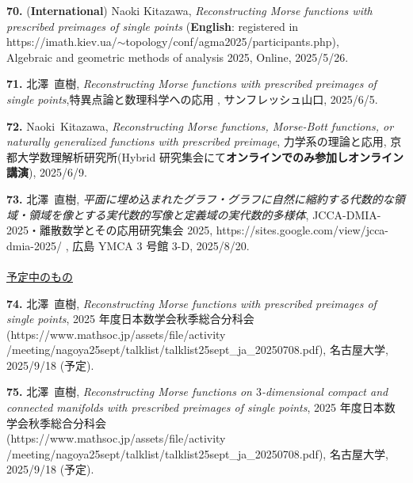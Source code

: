 \documentclass{article}
\begin{document}
\par\noindent
{\bf 70.} ({\bf International}) Naoki Kitazawa, \textsl{Reconstructing Morse functions with prescribed preimages of single points} ({\bf English}: registered in\\ https://imath.kiev.ua/$\sim$topology/conf/agma2025/participants.php),\\ Algebraic and geometric methods of analysis 2025, Online, 2025/5/26.

\par\noindent
{\bf 71.} 北澤\ 直樹, \textsl{Reconstructing Morse functions with prescribed preimages of single points},特異点論と数理科学への応用 , サンフレッシュ山口, 2025/6/5.

\par\noindent
{\bf 72.} Naoki\ Kitazawa, \textsl{Reconstructing Morse functions, Morse-Bott functions, or naturally generalized functions with prescribed preimage}, 力学系の理論と応用, 京都大学数理解析研究所(Hybrid 研究集会にて{\bf オンラインでのみ参加しオンライン講演}), 2025/6/9.

\par\noindent
{\bf 73.}  北澤\ 直樹, \textsl{平面に埋め込まれたグラフ・グラフに自然に縮約する代数的な領域・領域を像とする実代数的写像と定義域の実代数的多様体}, JCCA-DMIA-2025・離散数学とその応用研究集会 2025,
https://sites.google.com/view/jcca-dmia-2025/%
, 広島 YMCA 3 号館 3-D, 2025/8/20.
\\
\ \\
\noindent\underline{予定中のもの} \\



\par\noindent
{\bf 74.} 北澤\ 直樹, \textsl{Reconstructing Morse functions with prescribed preimages of single points}, 2025 年度日本数学会秋季総合分科会\\(https://www.mathsoc.jp/assets/file/activity\\
/meeting/nagoya25sept/talklist/talklist25sept\_ja\_20250708.pdf), 名古屋大学, 2025/9/18 (予定).

\par\noindent
{\bf 75.} 北澤\ 直樹, \textsl{Reconstructing Morse functions on $3$-dimensional compact and connected manifolds with prescribed preimages of single points}, 2025 年度日本数学会秋季総合分科会\\(https://www.mathsoc.jp/assets/file/activity\\
/meeting/nagoya25sept/talklist/talklist25sept\_ja\_20250708.pdf), 名古屋大学, 2025/9/18 (予定).
\end{document}
